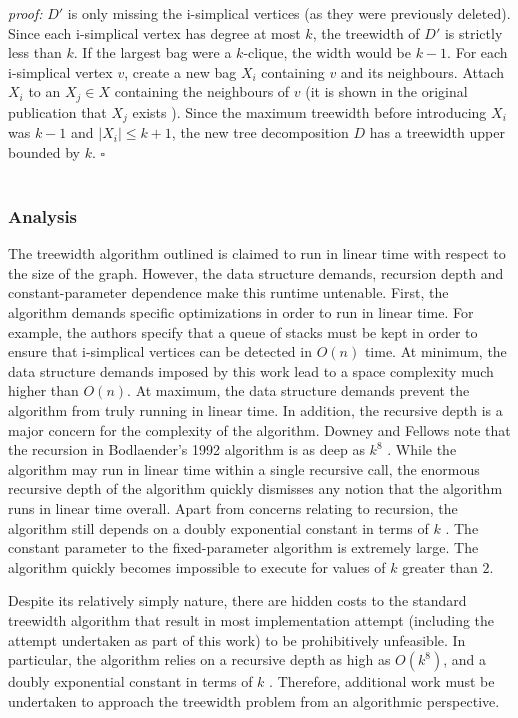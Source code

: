 \documentclass[12pt,conference]{IEEEtran}
\theoremstyle{plain}
\begin{document}
\textit{proof:} $D'$ is only missing the i-simplical vertices (as they were previously deleted). Since each i-simplical vertex has degree at most $k$, the treewidth of $D'$ is strictly less than $k$. If the largest bag were a $k$-clique, the width would be $k-1$. For each i-simplical vertex $v$, create a new bag $X_{i}$ containing $v$ and its neighbours. Attach $X_{i}$ to an $X_{j} \in X$ containing the neighbours of $v$ (it is shown in the original publication that $X_{j}$ exists \cite{bodlaender-1992}). Since the maximum treewidth before introducing $X_{i}$ was $k-1$ and $|X_{i}| \leq k+1$, the new tree decomposition $D$ has a treewidth upper bounded by $k$. $\square$
\\
\\
\subsubsection{Analysis}

The treewidth algorithm outlined is claimed to run in linear time with respect to the size of the graph. However, the data structure demands, recursion depth and constant-parameter dependence make this runtime untenable. First, the algorithm demands specific optimizations in order to run in linear time. For example, the authors specify that a queue of stacks must be kept in order to ensure that i-simplical vertices can be detected in $O(n)$ time. At minimum, the data structure demands imposed by this work lead to a space complexity much higher than $O(n)$. At maximum, the data structure demands prevent the algorithm from truly running in linear time. In addition, the recursive depth is a major concern for the complexity of the algorithm. Downey and Fellows note that the recursion in Bodlaender's 1992 algorithm is as deep as $k^{8}$ \cite{fellows-on-bodlaender}. While the algorithm may run in linear time within a single recursive call, the enormous recursive depth of the algorithm quickly dismisses any notion that the algorithm runs in linear time overall. Apart from concerns relating to recursion, the algorithm still depends on a doubly exponential constant in terms of $k$ \cite{fellows-on-bodlaender}. The constant parameter to the fixed-parameter algorithm is extremely large. The algorithm quickly becomes impossible to execute for values of $k$ greater than $2$.

Despite its relatively simply nature, there are hidden costs to the standard treewidth algorithm that result in most implementation attempt (including the attempt undertaken as part of this work) to be prohibitively unfeasible. In particular, the algorithm relies on a recursive depth as high as $O(k^{8})$, and a doubly exponential constant in terms of $k$ \cite{fellows-on-bodlaender}. Therefore, additional work must be undertaken to approach the treewidth problem from an algorithmic perspective. 
\end{document}
